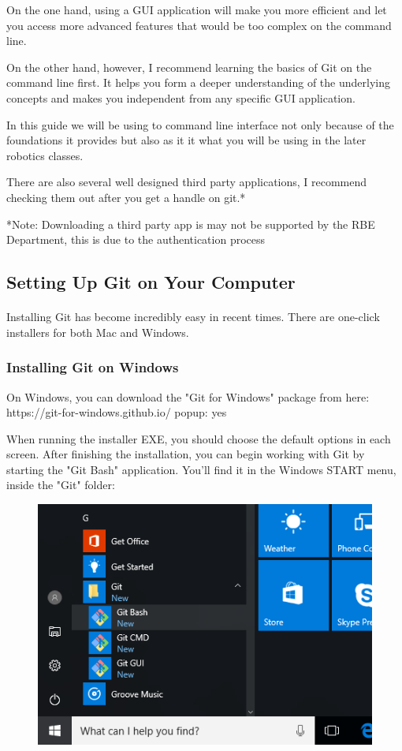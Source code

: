 \documentclass{article}
\begin{document}
On the one hand, using a GUI application will make you more efficient and let you access more advanced features that would be too complex on the command line.

On the other hand, however, I recommend learning the basics of Git on the command line first. It helps you form a deeper understanding of the underlying concepts and makes you independent from any specific GUI application.

In this guide we will be using to command line interface not only because of the foundations it provides but also as it it what you will be using in the later robotics classes.

There are also several well designed third party applications, I recommend checking them out after you get a handle on git.*

*Note: Downloading a third party app is may not be supported by the RBE Department, this is due to the authentication process 


\subsection{Setting Up Git on Your Computer}
\paragraph{}
Installing Git has become incredibly easy in recent times. There are one-click installers for both Mac and Windows.

\subsubsection{Installing Git on Windows}
On Windows, you can download the "Git for Windows" package from here: https://git-for-windows.github.io/ popup: yes

When running the installer EXE, you should choose the default options in each screen. After finishing the installation, you can begin working with Git by starting the "Git Bash" application. You'll find it in the Windows START menu, inside the "Git" folder:
\begin{figure}[hp]
    \centering
    \includegraphics[width=4.5in]{images/git-bash-windows}
\end{figure}
\end{document}
